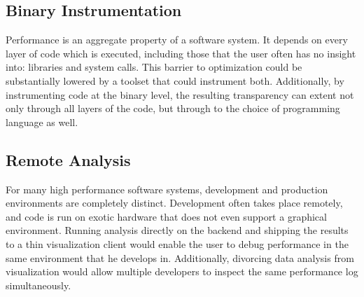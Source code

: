 \documentclass[annual]{acmsiggraph}
\begin{document}
  \subsection{Binary Instrumentation}

  Performance is an aggregate property of a software system.
  It depends on every layer of code which is executed, including those that the user often has no insight into:
    libraries and system calls.
  This barrier to optimization could be substantially lowered by a toolset that could instrument both.
  Additionally, by instrumenting code at the binary level, the resulting transparency can extent not only through
    all layers of the code, but through to the choice of programming language as well.

  \subsection{Remote Analysis}

  For many high performance software systems, development and production environments are completely distinct.
  Development often takes place remotely, and code is run on exotic hardware that does not even support a graphical environment.
  Running analysis directly on the backend and shipping the results to a thin visualization client would enable 
    the user to debug performance in the same environment that he develops in.
  Additionally, divorcing data analysis from visualization would allow multiple developers to inspect the same performance
    log simultaneously.
\end{document}
